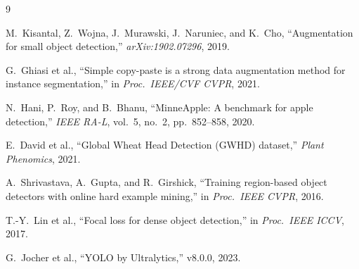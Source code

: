 \documentclass[10pt, a4paper]{article}
\begin{document}
\begin{thebibliography}{9}

M.~Kisantal, Z.~Wojna, J.~Murawski, J.~Naruniec, and K.~Cho,
``Augmentation for small object detection,''
\textit{arXiv:1902.07296}, 2019.

G.~Ghiasi et al.,
``Simple copy-paste is a strong data augmentation method for instance
segmentation,'' in \textit{Proc.\ IEEE/CVF CVPR}, 2021.

N.~Hani, P.~Roy, and B.~Bhanu,
``MinneApple: A benchmark for apple detection,''
\textit{IEEE RA-L}, vol.~5, no.~2, pp.~852--858, 2020.

E.~David et al.,
``Global Wheat Head Detection (GWHD) dataset,''
\textit{Plant Phenomics}, 2021.

A.~Shrivastava, A.~Gupta, and R.~Girshick,
``Training region-based object detectors with online hard example mining,''
in \textit{Proc.\ IEEE CVPR}, 2016.

T.-Y.~Lin et al.,
``Focal loss for dense object detection,''
in \textit{Proc.\ IEEE ICCV}, 2017.

G.~Jocher et al., ``YOLO by Ultralytics,'' v8.0.0, 2023.

\end{thebibliography}
\end{document}
